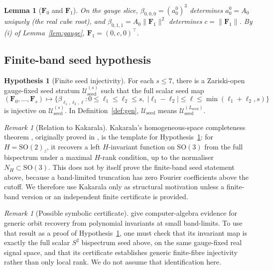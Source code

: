 \documentclass[11pt]{article}
\theoremstyle{plain}
\newtheorem{lemma}[theorem]{Lemma}
\theoremstyle{definition}
\newtheorem{hypothesis}[theorem]{Hypothesis}
\theoremstyle{remark}
\newtheorem{remark}[theorem]{Remark}
\newcommand{\SO}{\mathrm{SO}}
\newcommand{\abs}[1]{\lvert #1 \rvert}
\newcommand{\norm}[1]{\lVert #1 \rVert}
\newcommand{\Useed}{\mathcal{U}_{\mathrm{seed}}}
\begin{document}
\begin{lemma}[$\mathbf{F}_0$ and $\mathbf{F}_1$]\label{lem:F0F1}
On the gauge slice, $\beta_{0,0,0} = (a_0^0)^3$ determines $a_0^0 = A_0$
uniquely (the real cube root), and $\beta_{0,1,1} = A_0\norm{\mathbf{F}_1}^2$
determines $c = \norm{\mathbf{F}_1}$. By (i) of Lemma~\ref{lem:gauge},
$\mathbf{F}_1 = (0,c,0)^\top$.
\end{lemma}

\subsection{Finite-band seed hypothesis}
\label{sec:seed}

\begin{hypothesis}[Finite seed injectivity]\label{hyp:seed}
For each $s\le7$, there is a Zariski-open gauge-fixed seed stratum
$\Useed^{(s)}$ such that the full scalar seed map
\[
  (\mathbf{F}_0,\dots,\mathbf{F}_s)
  \longmapsto
  \{\beta_{\ell_1,\ell_2,\ell} :
    0\le\ell_1\le\ell_2\le s,\;
    \abs{\ell_1-\ell_2}\le\ell\le\min(\ell_1+\ell_2,s)\}
\]
is injective on $\Useed^{(s)}$. In Definition~\ref{def:gen}, $\Useed$
means $\Useed^{(L_{\mathrm{seed}})}$.
\end{hypothesis}

\begin{remark}[Relation to Kakarala]
Kakarala's homogeneous-space completeness theorem
\citep[Theorem~7]{kakarala2012bispectrum}, originally proved in
\citet{kakarala1992triple}, is the template for
Hypothesis~\ref{hyp:seed}: for $H=\SO(2)_z$, it recovers a left
$H$-invariant function on $\SO(3)$ from the full bispectrum under a
maximal $H$-rank condition, up to the normaliser $N_H\subset\SO(3)$.
This does not by itself prove the finite-band seed statement above,
because a band-limited truncation has zero Fourier coefficients above
the cutoff. We therefore use Kakarala only as structural motivation
unless a finite-band version or an independent finite certificate is
provided.
\end{remark}

\begin{remark}[Possible symbolic certificate]
\label{rem:bandeira}
\citet{bandeira2017estimation} give computer-algebra evidence for
generic orbit recovery from polynomial invariants at small band-limits.
To use that result as a proof of Hypothesis~\ref{hyp:seed}, one must
check that its invariant map is exactly the full scalar $S^2$
bispectrum seed above, on the same gauge-fixed real signal space, and
that its certificate establishes generic finite-fibre injectivity
rather than only local rank. We do not assume that identification here.
\end{remark}
\end{document}
